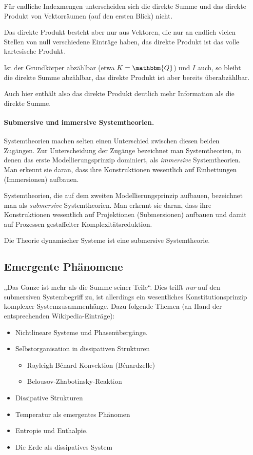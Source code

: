 \documentclass[11pt,a4paper]{article}
\begin{document}
Für endliche Indexmengen unterscheiden sich die direkte Summe und das direkte
Produkt von Vektorräumen (auf den ersten Blick) nicht.

Das direkte Produkt besteht aber nur aus Vektoren, die nur an endlich vielen
Stellen von null verschiedene Einträge haben, das direkte Produkt ist das
volle kartesische Produkt.

Ist der Grundkörper abzählbar (etwa $K=\mathbbm{Q}$) und $I$ auch, so bleibt
die direkte Summe abzählbar, das direkte Produkt ist aber bereits
überabzählbar.

Auch hier enthält also das direkte Produkt deutlich mehr Information als die
direkte Summe.

\paragraph{Submersive und immersive Systemtheorien.}
Systemtheorien machen selten einen Unterschied zwischen diesen beiden
Zugängen.  Zur Unterscheidung der Zugänge bezeichnet man Systemtheorien, in
denen das erste Modellierungsprinzip dominiert, als \emph{immersive}
Systemtheorien. Man erkennt sie daran, dass ihre Konstruktionen wesentlich auf
Einbettungen (Immersionen) aufbauen.

Systemtheorien, die auf dem zweiten Modellierungsprinzip aufbauen, bezeichnet
man als \emph{submersive} Systemtheorien.  Man erkennt sie daran, dass ihre
Konstruktionen wesentlich auf Projektionen (Submersionen) aufbauen und damit
auf Prozessen gestaffelter Komplexitätsreduktion.

Die Theorie dynamischer Systeme ist eine submersive Systemtheorie.

\subsection{Emergente Phänomene}

„Das Ganze ist mehr als die Summe seiner Teile“. Dies trifft \emph{nur} auf
den submersiven Systembegriff zu, ist allerdings ein wesentliches
Konstitutionsprinzip komplexer Systemzusammenhänge.  Dazu folgende Themen (an
Hand der entsprechenden Wikipedia-Einträge):

\begin{itemize}[noitemsep]
\item Nichtlineare Systeme und Phasenübergänge.
\item Selbstorganisation in dissipativen Strukturen
  \begin{itemize}[noitemsep]
  \item Rayleigh-Bénard-Konvektion (Bénardzelle)
  \item Belousov-Zhabotinsky-Reaktion
  \end{itemize}
\item Dissipative Strukturen
\item Temperatur als emergentes Phänomen
\item {Entropie} und {Enthalpie}.
\item Die Erde als dissipatives System
\end{itemize}
\end{document}
